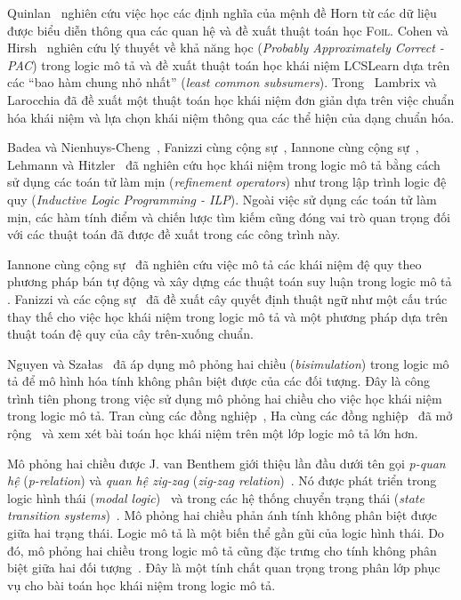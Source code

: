 Quinlan~\cite{Quinlan1990} nghiên cứu việc học các định nghĩa của mệnh đề Horn từ các dữ liệu được biểu diễn thông qua các quan hệ và đề xuất thuật toán học \textsc{Foil}.
Cohen và Hirsh~\cite{Cohen1994} nghiên cứu lý thuyết về khả năng học ({\em Probably Approximately Correct - PAC}) trong logic mô tả và đề xuất thuật toán học khái niệm LCSLearn dựa trên các ``bao hàm chung nhỏ nhất'' ({\em least common subsumers}).
Trong~\cite{Lambrix1998} Lambrix và Larocchia đã đề xuất một thuật toán học khái niệm đơn giản dựa trên việc chuẩn hóa khái niệm và lựa chọn khái niệm thông qua các thể hiện của dạng chuẩn hóa. 

Badea và Nienhuys-Cheng~\cite{Badea2000}, Fanizzi cùng cộng sự~\cite{Fanizzi2004,Fanizzi2008}, Iannone cùng cộng sự~\cite{Iannone2007}, Lehmann và Hitzler~\cite{Lehmann2007,Lehmann2010} đã nghiên cứu học khái niệm trong logic mô tả bằng cách sử dụng các toán tử làm mịn ({\em refinement operators}) như trong lập trình logic đệ quy ({\em Inductive Logic Programming - ILP}).
Ngoài việc sử dụng các toán tử làm mịn, các hàm tính điểm và chiến lược tìm kiếm cũng đóng vai trò quan trọng đối với các thuật toán đã được đề xuất trong các công trình này. 

Iannone cùng cộng sự~\cite{Iannone2007} đã nghiên cứu việc mô tả các khái niệm đệ quy theo phương pháp bán tự động và xây dựng các thuật toán suy luận trong logic mô tả \ALC.
%
Fanizzi và các cộng sự~\cite{Fanizzi2010} đã đề xuất cây quyết định thuật ngữ như một cấu trúc thay thế cho việc học khái niệm trong logic mô tả và một phương pháp dựa trên thuật toán đệ quy của cây trên-xuống chuẩn.

Nguyen và Sza{\l}as~\cite{Nguyen2013} đã áp dụng mô phỏng hai chiều ({\em bisimulation}) trong logic mô tả để mô hình hóa tính không phân biệt được của các đối tượng. Đây là công trình tiên phong trong việc sử dụng mô phỏng hai chiều cho việc học khái niệm trong logic mô tả. Tran cùng các đồng nghiệp~\cite{Tran2012}, Ha cùng các đồng nghiệp~\cite{Ha2012} đã mở rộng~\cite{Nguyen2013} và xem xét bài toán học khái niệm trên một lớp logic mô tả lớn hơn.

Mô phỏng hai chiều được J. van Benthem giới thiệu lần đầu dưới tên gọi {\em p-quan hệ} ({\em p-relation}) và {\em quan hệ zig-zag} ({\em zig-zag relation})~\cite{Benthem2001,Blackburn2001,Blackburn2006}. Nó được phát triển trong logic hình thái ({\em modal logic})~\cite{Benthem2001,Blackburn2001,Benthem2010} và trong các hệ thống chuyển trạng thái ({\em state transition systems})~\cite{Park1981,Hennessy1985}. Mô phỏng hai chiều phản ánh tính không phân biệt được giữa hai trạng thái.
Logic mô tả là một biến thể gần gũi của logic hình thái. Do đó, mô phỏng hai chiều trong logic mô tả cũng đặc trưng cho tính không phân biệt giữa hai đối tượng~\cite{Divroodi2011}. Đây là một tính chất quan trọng trong phân lớp phục vụ cho bài toán học khái niệm trong logic mô tả.


